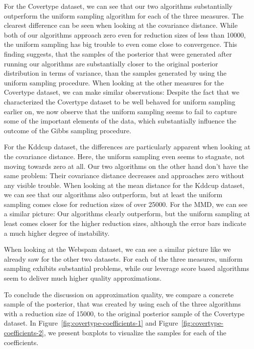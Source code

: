 For the Covertype dataset, we can see that our two algorithms
substantially outperform the uniform sampling algorithm for
each of the three measures. The clearest difference can be
seen when looking at the covariance distance.
While both of our algorithms approach zero even for
reduction sizes of less than 10000, the uniform sampling
has big trouble to even come close to convergence.
This finding suggests, that the samples of the posterior
that were generated after running our algorithms are
substantially closer to the original posterior distribution
in terms of variance, than the samples generated by using the
uniform sampling procedure.
When looking at the other measures for the Covertype dataset,
we can make similar observations: Despite the fact that we
characterized the Covertype dataset to be well behaved for
uniform sampling earlier on, we now observe that the uniform sampling
seems to fail to capture some of the important elements of the
data, which substantially influence the outcome of the Gibbs
sampling procedure.

For the Kddcup dataset, the differences are particularly apparent
when looking at the covariance distance. Here, the uniform sampling
even seems to stagnate, not moving towards zero at all.
Our two algorithms on the other hand don't have the same problem:
Their covariance distance decreases and approaches zero without
any visible trouble.
When looking at the mean distance for the Kddcup dataset, we can
see that our algorithms also outperform, but at least the uniform sampling
comes close for reduction sizes of over 25000.
For the MMD, we can see a similar picture: Our algorithms clearly
outperform, but the uniform sampling at least comes closer
for the higher reduction sizes, although the error bars indicate
a much higher degree of instability.

When looking at the Webspam dataset, we can see a similar picture
like we already saw for the other two datasets. For each
of the three measures, uniform sampling exhibits substantial
problems, while our leverage score based algorithms seem to
deliver much higher quality approximations.

To conclude the discussion on approximation quality, we compare
a concrete sample of the posterior, that was created by using each
of the three algorithms with a reduction size
of 15000, to the original posterior sample of the Covertype dataset.
In Figure~\ref{fig:covertype-coefficients-1} and
Figure~\ref{fig:covertype-coefficients-2}, we present boxplots to
visualize the samples for each of the coefficients.

